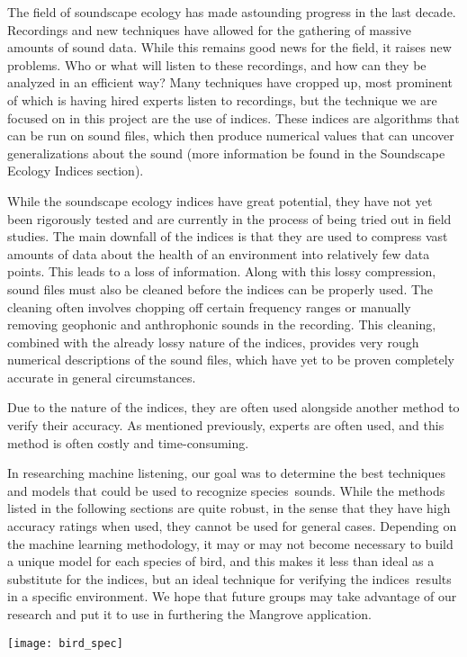 The field of soundscape ecology has made astounding progress in the last decade.
Recordings and new techniques have allowed for the gathering of massive amounts of sound data. While this remains good news for the field, it raises new problems. Who or what will listen to these recordings, and how can they be analyzed in an efficient way? Many techniques have cropped up, most prominent of which is having hired experts listen to recordings, but the technique we are focused on in this project are the use of indices. These indices are algorithms that can be run on sound files, which then produce numerical values that can uncover generalizations about the sound (more information be found in the Soundscape Ecology Indices section).\par
While the soundscape ecology indices have great potential, they have not yet been rigorously tested and are currently in the process of being tried out in field studies. The main downfall of the indices is that they are used to compress vast amounts of data about the health of an environment into relatively few data points. This leads to a loss of information. Along with this lossy compression, sound files must also be cleaned before the indices can be properly used. The cleaning often involves chopping off certain frequency ranges or manually removing geophonic and anthrophonic sounds in the recording. This cleaning, combined with the already lossy nature of the indices, provides very rough numerical descriptions of the sound files, which have yet to be proven completely accurate in general circumstances.\par
Due to the nature of the indices, they are often used alongside another method to verify their accuracy. As mentioned previously, experts are often used, and this method is often costly and time-consuming.\par
In researching machine listening, our goal was to determine the best techniques and models that could be used to recognize species\textquotesingle\ sounds. While the methods listed in the following sections are quite robust, in the sense that they have high accuracy ratings when used, they cannot be used for general cases. Depending on the machine learning methodology, it may or may not become necessary to build a unique model for each species of bird, and this makes it less than ideal as a substitute for the indices, but an ideal technique for verifying the indices\textquotesingle\ results in a specific environment. We hope that future groups may take advantage of our research and put it to use in furthering the Mangrove application.\par
\begin{center}
	\texttt{[image: bird\_spec]}
\end{center}
